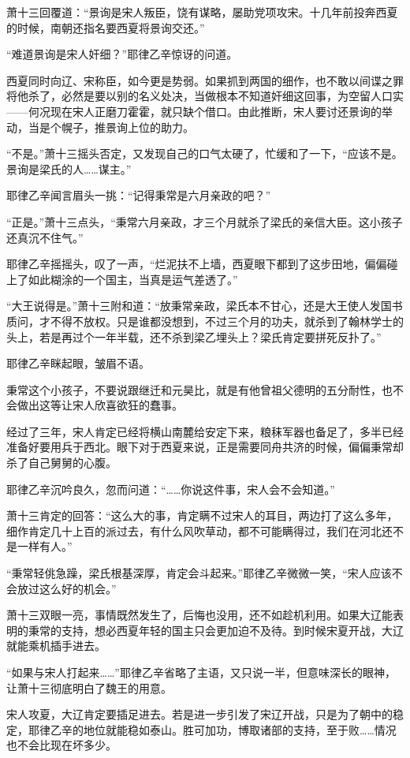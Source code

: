 萧十三回覆道：“景询是宋人叛臣，饶有谋略，屡助党项攻宋。十几年前投奔西夏的时候，南朝还指名要西夏将景询交还。”

“难道景询是宋人奸细？”耶律乙辛惊讶的问道。

西夏同时向辽、宋称臣，如今更是势弱。如果抓到两国的细作，也不敢以间谍之罪将他杀了，必然是要以别的名义处决，当做根本不知道奸细这回事，为空留人口实——何况现在宋人正磨刀霍霍，就只缺个借口。由此推断，宋人要讨还景询的举动，当是个幌子，推景询上位的助力。

“不是。”萧十三摇头否定，又发现自己的口气太硬了，忙缓和了一下，“应该不是。景询是梁氏的人……谋主。”

耶律乙辛闻言眉头一挑：“记得秉常是六月亲政的吧？”

“正是。”萧十三点头，“秉常六月亲政，才三个月就杀了梁氏的亲信大臣。这小孩子还真沉不住气。”

耶律乙辛摇摇头，叹了一声，“烂泥扶不上墙，西夏眼下都到了这步田地，偏偏碰上了如此糊涂的一个国主，当真是运气差透了。”

“大王说得是。”萧十三附和道：“放秉常亲政，梁氏本不甘心，还是大王使人发国书质问，才不得不放权。只是谁都没想到，不过三个月的功夫，就杀到了翰林学士的头上，若是再过个一年半载，还不杀到梁乙埋头上？梁氏肯定要拼死反扑了。”

耶律乙辛眯起眼，皱眉不语。

秉常这个小孩子，不要说跟继迁和元昊比，就是有他曾祖父德明的五分耐性，也不会做出这等让宋人欣喜欲狂的蠢事。

经过了三年，宋人肯定已经将横山南麓给安定下来，粮秣军器也备足了，多半已经准备好要用兵于西北。眼下对于西夏来说，正是需要同舟共济的时候，偏偏秉常却杀了自己舅舅的心腹。

耶律乙辛沉吟良久，忽而问道：“……你说这件事，宋人会不会知道。”

萧十三肯定的回答：“这么大的事，肯定瞒不过宋人的耳目，两边打了这么多年，细作肯定几十上百的派过去，有什么风吹草动，都不可能瞒得过，我们在河北还不是一样有人。”

“秉常轻佻急躁，梁氏根基深厚，肯定会斗起来。”耶律乙辛微微一笑，“宋人应该不会放过这么好的机会。”

萧十三双眼一亮，事情既然发生了，后悔也没用，还不如趁机利用。如果大辽能表明的秉常的支持，想必西夏年轻的国主只会更加迫不及待。到时候宋夏开战，大辽就能乘机插手进去。

“如果与宋人打起来……”耶律乙辛省略了主语，又只说一半，但意味深长的眼神，让萧十三彻底明白了魏王的用意。

宋人攻夏，大辽肯定要插足进去。若是进一步引发了宋辽开战，只是为了朝中的稳定，耶律乙辛的地位就能稳如泰山。胜可加功，博取诸部的支持，至于败……情况也不会比现在坏多少。

